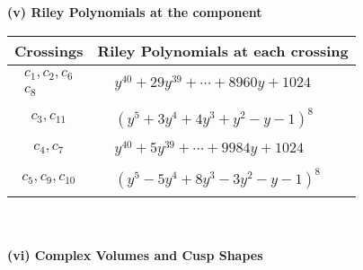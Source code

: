 \documentclass[1p]{elsarticle_modified}
\theoremstyle{definition}
\begin{document}
\newpage\renewcommand{\arraystretch}{1}
\flushleft \textbf{(v) Riley Polynomials at the component}\newline \\
\begin{tabular}{m{50pt}|m{274pt}}
Crossings & \hspace{64pt}Riley Polynomials at each crossing \\
\hline $$\begin{aligned}c_{1},c_{2},c_{6}\\c_{8}\end{aligned}$$&$\begin{aligned}
&y^{40}+29 y^{39}+\cdots+8960 y+1024
\end{aligned}$\\
\hline $$\begin{aligned}c_{3},c_{11}\end{aligned}$$&$\begin{aligned}
&(y^5+3 y^4+4 y^3+y^2- y-1)^8
\end{aligned}$\\
\hline $$\begin{aligned}c_{4},c_{7}\end{aligned}$$&$\begin{aligned}
&y^{40}+5 y^{39}+\cdots+9984 y+1024
\end{aligned}$\\
\hline $$\begin{aligned}c_{5},c_{9},c_{10}\end{aligned}$$&$\begin{aligned}
&(y^5-5 y^4+8 y^3-3 y^2- y-1)^8
\end{aligned}$\\
\hline
\end{tabular}\\~\\
\newpage\flushleft \textbf{(vi) Complex Volumes and Cusp Shapes}
\end{document}
